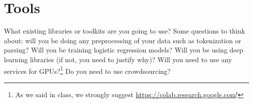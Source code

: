 \documentclass[11pt,a4paper]{article}
\begin{document}
\section{Tools}
What existing libraries or toolkits are you going to use? Some questions to think about: will you be doing any preprocessing of your data such as tokenization or parsing? Will you be training logistic regression models? Will you be using deep learning libraries (if not, you need to justify why)? Will you need to use any services for GPUs?\footnote{As we said in class, we strongly suggest \url{https://colab.research.google.com}!} Do you need to use crowdsourcing?


\footnotesize

\end{document}
